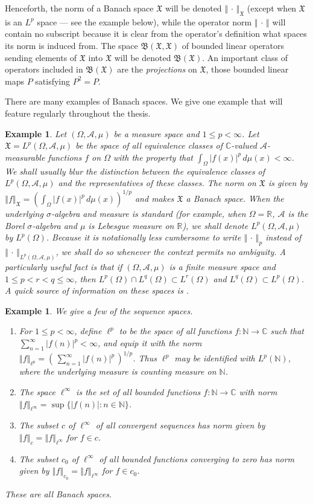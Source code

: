 \documentclass[mmath,12pt]{unswthesis}   %
\newcommand{\R}{\mathbb{R}}
\newcommand{\C}{\mathbb{C}}
\newcommand{\N}{\mathbb{N}}
\newcommand{\B}{\mathfrak{B}}
\newcommand{\X}{\mathfrak{X}}
\newcommand{\A}{\mathcal{A}}
\def\lp{\ell^p}
\def\norm#1{\left \Vert #1 \right \Vert}
\newtheorem{example}[theorem]{Example}
\numberwithin{equation}{section}
\begin{document}
Henceforth, the norm of a Banach space $\X$ will be denoted
$\norm{\,\cdot\,}_{\X}$ (except when $\X$ is an $L^p$ space --- see the
example below), while the operator norm $\norm{\,\cdot\,}$ will
contain no subscript because it is clear from the operator's definition what
spaces its norm is induced from. The space $\B(\X,\X)$ of bounded linear
operators sending elements of $\X$ into $\X$ will be denoted $\B(\X)$. An
important class of operators included in $\B(\X)$ are the {\em projections} on
$\X$, those bounded linear maps $P$ satisfying $P^2=P$.

There are many examples of Banach spaces. We give one example that will feature
regularly throughout the thesis.

\begin{example}\label{L^p example}
Let $(\Omega,\A,\mu)$ be a measure space and $1\leq p<\infty$. Let
$\X=L^p(\Omega,\A,\mu)$ be the space of all equivalence classes of
$\C$-valued $\A$-measurable functions $f$ on $\Omega$ with the property that
$\int_{\Omega}|f(x)|^p\,d\mu(x)<\infty$. We shall usually blur the distinction
between the equivalence classes of $L^p(\Omega,\A,\mu)$ and the representatives
of these classes. The norm on $\X$ is given by
$\norm{f}_{\X}=(\int_{\Omega}|f(x)|^p\,d\mu(x))^{1/p}$ and
makes $\X$ a Banach space. When the underlying $\sigma$-algebra and measure is
standard (for example, when $\Omega=\R$, $\A$ is the Borel $\sigma$-algebra
and $\mu$ is Lebesgue measure on $\R$), we shall denote
$L^p(\Omega,\A,\mu)$ by $L^p(\Omega)$. 
Because it
is notationally less cumbersome to write $\norm{\,\cdot\,}_p$ instead of
$\norm{\,\cdot\,}_{L^p(\Omega,\A,\mu)}$, we shall do so whenever the context
permits no ambiguity. A particularly useful fact is that if $(\Omega,\A,\mu)$ is
a finite measure space and $1\leq p<r<q\leq\infty$, then
$L^p(\Omega)\cap L^q(\Omega)\subset L^r(\Omega)$ and
$L^q(\Omega)\subset L^p(\Omega)$. A quick source of information on these spaces
is \cite[\S 6.4]{Pedersen}.
\end{example}

\begin{example}
We give a few of the sequence spaces. 
\begin{enumerate}
\item For $1\leq p<\infty$, define $\lp$ to be
the space of all functions $f:\N\rightarrow\C$ such that
$\sum_{n=1}^{\infty}|f(n)|^p<\infty$, and equip it with the norm
$\norm{f}_{\lp}=(\,\sum_{n=1}^{\infty}|f(n)|^p\,)^{1/p}$. Thus $\lp$ may be
identified with $L^p(\N)$, where the underlying measure is counting measure on
$\N$.
\item The space $\ell^{\infty}$ is the set of all bounded functions
$f:\N\rightarrow\C$ with norm $\norm{f}_{\ell^{\infty}}=\sup\{|f(n)|:n\in\N\}$.
\item The subset $c$ of $\ell^{\infty}$ of all convergent sequences 
has norm given by $\norm{f}_c=\norm{f}_{\ell^{\infty}}$ for $f\in c$.
\item The subset $c_0$ of $\ell^{\infty}$ of all bounded functions converging to
zero has norm given by $\norm{f}_{c_0}=\norm{f}_{\ell^{\infty}}$ for $f\in c_0$.
\end{enumerate}These are all Banach spaces.
\end{example}
\end{document}
